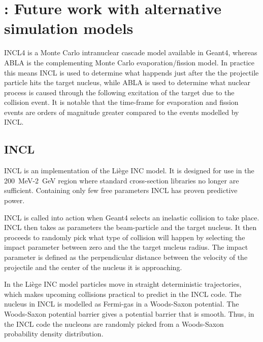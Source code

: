 \clearpage
\renewcommand{\theequation}{D\arabic{equation}}
\setcounter{equation}{0}  
\renewcommand{\thefigure}{D\arabic{figure}}
\setcounter{figure}{0}
\renewcommand{\thetable}{D\arabic{table}}
\setcounter{table}{0}
\renewcommand{\thesection}{D}
\setcounter{section}{1}
\setcounter{subsection}{0}
\section{\label{appendixincltheory}: Future work with alternative simulation models}

INCL4 is a Monte Carlo intranuclear cascade model available in Geant4, whereas ABLA is the complementing Monte Carlo evaporation/fission model. In practice this means INCL is used to determine what happends just after the the projectile particle hits the target nucleus, while ABLA is used to determine what nuclear process is caused through the following excitation of the target due to the collision event. It is notable that the time-frame for evaporation and fission events are orders of magnitude greater compared to the events modelled by INCL.

\subsection{INCL}

INCL is an implementation of the Liège INC model. It is designed for use in the 200~MeV-2~GeV region where standard cross-section libraries no longer are sufficient. Containing only few free parameters INCL has proven predictive power.

INCL is called into action when Geant4 selects an inelastic collision to take place. INCL then takes as parameters the beam-particle and the target nucleus. It then proceeds to randomly pick what type of collision will happen by selecting the impact parameter between zero and the the target nucleus radius. The impact parameter is defined as the perpendicular distance between the velocity of the projectile and the center of the nucleus it is approaching.

In the Liège INC model particles move in straight deterministic trajectories, which makes upcoming collisions practical to predict in the INCL code.
 The nucleus in INCL is modelled as Fermi-gas in a Woods-Saxon potential. %
 The Woods-Saxon potential barrier gives a potential barrier that is smooth. Thus, in the INCL code the nucleons are randomly picked from a Woods-Saxon probability density distribution.

